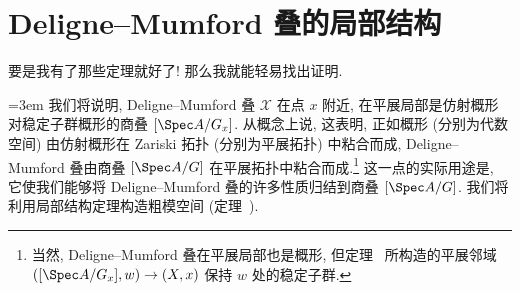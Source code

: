\section{Deligne--Mumford 叠的局部结构}\label{src:5.3}
\begin{epigraph}
要是我有了那些定理就好了! 那么我就能轻易找出证明.
\end{epigraph}
{\emergencystretch=3em
我们将说明, Deligne--Mumford 叠 $\mathcal X$ 在点 $x$ 附近, 在平展局部是仿射概形对稳定子群概形的商叠 $[\Spec A/G_x]$. 从概念上说, 这表明, 正如概形 (分别为代数空间) 由仿射概形在 Zariski 拓扑 (分别为平展拓扑) 中粘合而成, Deligne--Mumford 叠由商叠 $[\Spec A/G]$ 在平展拓扑中粘合而成.\footnote{当然, Deligne--Mumford 叠在平展局部也是概形, 但定理~ 所构造的平展邻域 $([\Spec A/G_x],w)\to(\mathcal X,x)$ 保持 $w$ 处的稳定子群.} 这一点的实际用途是, 它使我们能够将 Deligne--Mumford 叠的许多性质归结到商叠 $[\Spec A/G]$. 我们将利用局部结构定理构造粗模空间 (定理~).\par}


